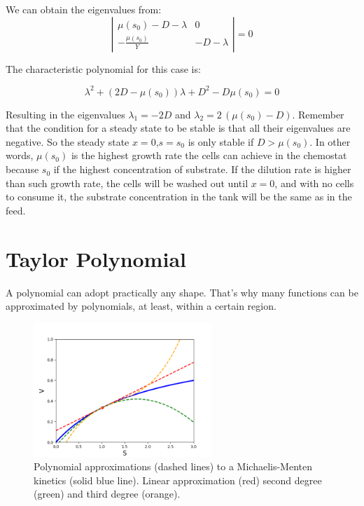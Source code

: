 \documentclass[12pt]{article}
\begin{document}
We can obtain the eigenvalues from:
 \begin{equation}
\left| \begin{matrix}  \mu(s_0) - D - \lambda  & 0\\   - \frac{\mu(s_0)
	}{Y}  &  - D- \lambda
\end{matrix} \right| = 0 \nonumber
\end{equation}

The characteristic polynomial for this case is:

 \begin{equation}
	\lambda^2 + \left( 2 D - \mu(s_0)\right) \lambda  +D^2-D \mu(s_0) = 0  \nonumber
\end{equation}

Resulting in the eigenvalues $\lambda_1 = -2 D$ and $\lambda_2 = 2\,(\mu(s_0) - D)$. Remember that the condition for a steady state to be stable is that all their eigenvalues are negative. So the steady state $x=0$,$s=s_0$ is only stable if $D > \mu(s_0)$. In other words, $\mu(s_0)$ is the highest growth rate the cells can achieve in the chemostat because $s_0$ if the highest concentration of substrate. If the dilution rate is higher than such growth rate, the cells will be washed out until $x=0$, and with no cells to consume it, the substrate concentration in the tank will be the same as in the feed.



\clearpage
\appendix
\section{Taylor Polynomial}
A polynomial can adopt practically any shape. That's why many functions can be approximated by polynomials, at least, within a certain region.

\begin{figure}[htb]
	\begin{center}
		\includegraphics[width=0.6\textwidth]{MMapprox}
	\end{center}
	\caption{Polynomial approximations (dashed lines) to a Michaelis-Menten kinetics (solid blue line). Linear approximation (red) second degree (green) and third degree (orange).}
	\label{fig:MMapprox}
\end{figure}
\end{document}
